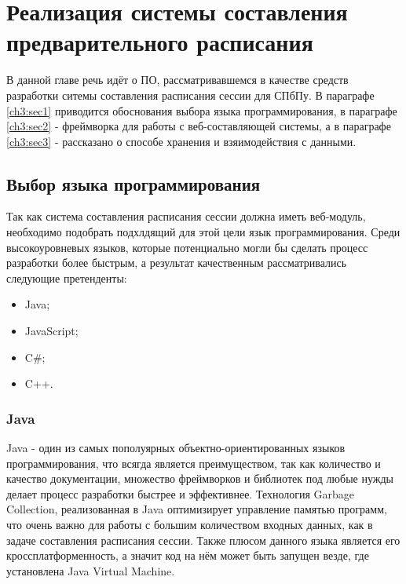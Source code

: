 \chapter{Реализация системы составления предварительного расписания} \label{ch3}
В данной главе речь идёт о ПО, рассматривавшемся в качестве средств разработки ситемы составления расписания сессии для СПбПу. В параграфе \ref{ch3:sec1} приводится обоснования выбора языка программирования, в параграфе \ref{ch3:sec2} - фреймворка для работы с веб-составляющей системы, а в параграфе \ref{ch3:sec3} - рассказано о способе хранения и взяимодействия с данными.
	
\section{Выбор языка программирования}
Так как система составления расписания сессии должна иметь веб-модуль, необходимо подобрать подхлдящий для этой цели язык программирования. Среди высокоуровневых языков, которые потенциально могли бы сделать процесс разработки более быстрым, а результат качественным рассматривались следующие претенденты: 
\begin{itemize}
\item  Java;
\item  JavaScript;
\item  C\#;	
\item  C++.	
\end{itemize}

\subsection{Java}
Java - один из самых пополуярных объектно-ориентированных языков программирования, что всягда является преимуществом, так как количество и качество документации, множество фреймворков и библиотек под любые нужды делает процесс разработки быстрее и эффективнее. Технология Garbage Collection, реализованная в Java оптимизирует управление памятью программ, что очень важно для работы с большим количеством входных данных, как в задаче составления расписания сессии. Также плюсом данного языка является его кроссплатформенность, а значит код на нём может быть запущен везде, где установлена Java Virtual Machine. 

